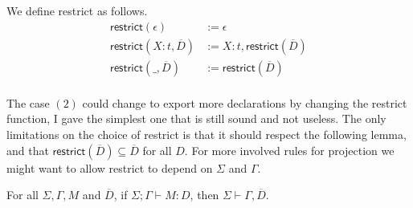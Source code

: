 \documentclass[a4paper,10pt]{article}
\begin{document}
{We define \textsf{restrict} as follows.
\begin{align*}
  \textsf{restrict}(\epsilon) &:= \epsilon\\
  \textsf{restrict}(X:t,\overline{D}) &:= X:t,\textsf{restrict}(\overline{D})\\
  \textsf{restrict}(\_,\overline{D}) &:= \textsf{restrict}(\overline{D})\\
\end{align*}

The case $(2)$ could change to export more declarations by changing the
\textsf{restrict} function, I gave the simplest one that is still sound and not
useless. The only limitations on the choice of \textsf{restrict} is that it
should respect the following lemma, and that
$\textsf{restrict}(\overline{D})\subseteq \overline{D}$ for all $D$. For more
involved rules for projection we might want to allow \textsf{restrict} to depend
on $\Sigma$ and $\Gamma$.
\begin{lemma}
  For all $\Sigma,\Gamma, M$ and $\overline{D}$, if $\Sigma;\Gamma\vdash M:D$,
  then $\Sigma\vdash\Gamma,\overline{D}$.
\end{lemma}}
\end{document}
